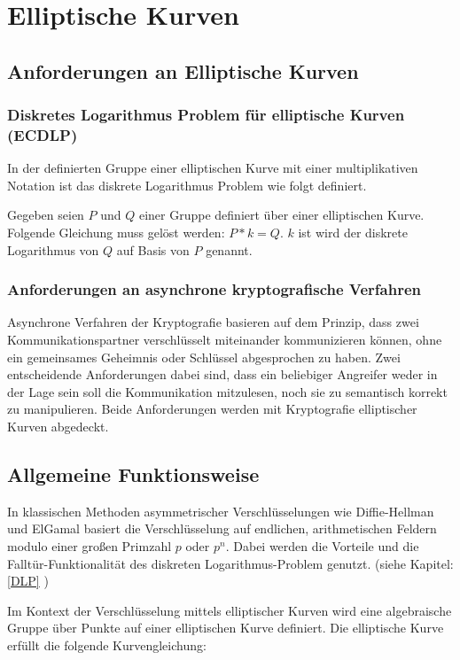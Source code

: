 
\chapter{Elliptische Kurven}

\section{Anforderungen an Elliptische Kurven}


\subsection{Diskretes Logarithmus Problem für elliptische Kurven (ECDLP)}
In der definierten Gruppe einer elliptischen Kurve mit einer multiplikativen Notation
ist das diskrete Logarithmus Problem wie folgt definiert.

Gegeben seien $P$ und $Q$ einer Gruppe definiert über einer elliptischen Kurve.
Folgende Gleichung muss gelöst werden: $ P*k = Q $. $k$ ist wird der diskrete Logarithmus von $Q$
auf Basis von $P$ genannt.

\subsection{Anforderungen an asynchrone kryptografische Verfahren}

Asynchrone Verfahren der Kryptografie basieren auf dem Prinzip, dass zwei Kommunikationspartner verschlüsselt miteinander kommunizieren können, ohne ein gemeinsames Geheimnis oder Schlüssel abgesprochen zu haben. Zwei entscheidende Anforderungen dabei sind, dass ein beliebiger Angreifer weder in der Lage sein soll die Kommunikation mitzulesen, noch sie zu semantisch korrekt zu manipulieren.
Beide Anforderungen werden mit Kryptografie elliptischer Kurven abgedeckt.

\section{Allgemeine Funktionsweise} \label{ECC_DLP}

In klassischen Methoden asymmetrischer Verschlüsselungen wie Diffie-Hellman und ElGamal basiert die
Verschlüsselung auf endlichen, arithmetischen Feldern modulo einer großen Primzahl $p$ oder $p^n$.
Dabei werden die Vorteile und die Falltür-Funktionalität des diskreten Logarithmus-Problem genutzt.
(siehe Kapitel: \ref{DLP} )

Im Kontext der Verschlüsselung mittels elliptischer Kurven wird eine algebraische Gruppe über Punkte
auf einer elliptischen Kurve definiert. 
Die elliptische Kurve erfüllt die folgende Kurvengleichung:

